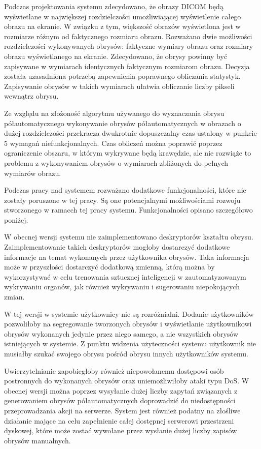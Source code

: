 \documentclass[a4paper,11pt,twoside,openright]{report}
\theoremstyle{definition}
\begin{document}
Podczas projektowania systemu zdecydowano, że obrazy DICOM będą wyświetlane w największej rozdzielczości umożliwiającej wyświetlenie całego obrazu na ekranie. W związku z tym, większość obrazów wyświetlona jest w rozmiarze różnym od faktycznego rozmiaru obrazu. Rozważano dwie możliwości rozdzielczości wykonywanych obrysów: faktyczne wymiary obrazu oraz rozmiary obrazu wyświetlanego na ekranie. Zdecydowano, że obrysy powinny być zapisywane w wymiarach identycznych faktycznym rozmiarom obrazu. Decyzja została uzasadniona potrzebą zapewnienia poprawnego obliczania statystyk. Zapisywanie obrysów w takich wymiarach ułatwia obliczanie liczby pikseli wewnątrz obrysu.

Ze względu na złożoność algorytmu używanego do wyznaczania obrysu półautomatycznego wykonywanie obrysów półautomatycznych w obrazach o dużej rozdzielczości przekracza dwukrotnie dopuszczalny czas ustalony w punkcie 5 wymagań niefunkcjonalnych. Czas obliczeń można poprawić poprzez ograniczenie obszaru, w którym wykrywane będą krawędzie, ale nie rozwiąże to problemu z wykonywaniem obrysów o wymiarach zbliżonych do pełnych wymiarów obrazu.

Podczas pracy nad systemem rozważano dodatkowe funkcjonalności, które nie zostały poruszone w tej pracy. Są one potencjalnymi możliwościami rozwoju stworzonego w ramacch tej pracy systemu. Funkcjonalności opisano szczegółowo poniżej.

W obecnej wersji systemu nie zaimplementowano deskryptorów kształtu obrysu. Zaimplementowanie takich deskryptorów mogłoby dostarczyć dodatkowe informacje na temat wykonanych przez użytkownika obrysów. Taka informacja może w przyszłości dostarczyć dodatkową zmienną, którą można by wykorzystywać w celu trenowania sztucznej inteligencji w zautomatyzowanym wykrywaniu organów, jak również wykrywaniu i sugerowaniu niepokojących zmian.

W tej wersji w systemie użytkownicy nie są rozróżnialni. Dodanie użytkowników pozwoliłoby na segregowanie tworzonych obrysów i wyświetlanie użytkownikowi obrysów wykonanych jedynie przez niego samego, a nie wszystkich obrysów istniejących w systemie. Z punktu widzenia użyteczności systemu użytkownik nie musiałby szukać swojego obrysu pośród obrysu innych użytkowników systemu.

Uwierzytelnianie zapobiegłoby również niepowołanemu dostępowi osób postronnych do wykonanych obrysów oraz uniemożliwiłoby ataki typu DoS. W obecnej wersji można poprzez wysyłanie dużej liczby zapytań związanych z generowaniem obrysów półautomatycznych doprowadzić do niedostępności przeprowadzania akcji na serwerze. System jest również podatny na złośliwe działanie mające na celu zapełnienie całej dostępnej serwerowi przestrzeni dyskowej, które może zostać wywołane przez wysłanie dużej liczby zapisów obrysów manualnych.
\end{document}
